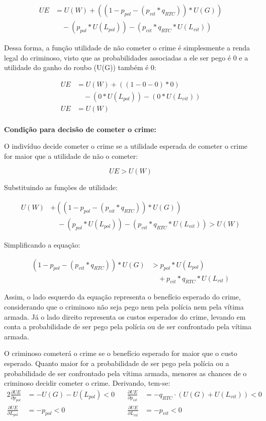 \documentclass[12pt]{article}
\begin{document}
\begin{align*}
UE &= U(W) + \left( \left( 1 - p_{pol} - (p_{vit} * q_{RTC}) \right) * U(G) \right) \\
   &\quad - \left( p_{pol} * U(L_{pol}) \right) - \left( p_{vit} * q_{RTC} * U(L_{vit}) \right)
\end{align*}

Dessa forma, a função utilidade de não cometer o crime é simplesmente a
renda legal do criminoso, visto que as probabilidades associadas a ele
ser pego é 0 e a utilidade do ganho do roubo (U(G)) também é 0:

\begin{align*}
UE &= U(W) + \left( (1 - 0 - 0) * 0 \right) \\
   &\quad - \left( 0 * U(L_{pol}) \right) - \left( 0 * U(L_{vit}) \right) \\
UE &= U(W)
\end{align*}\\

\textbf{Condição para decisão de cometer o crime:}

O indivíduo decide cometer o crime se a utilidade esperada de cometer o
crime for maior que a utilidade de não o cometer:

\[
UE > U(W)
\]

Substituindo as funções de utilidade:

\begin{align*}
U(W) &+ \left( \left( 1 - p_{pol} - (p_{vit} * q_{RTC}) \right) * U(G) \right) \\
     &\quad - \left( p_{pol} * U(L_{pol}) \right) - \left( p_{vit} * q_{RTC} * U(L_{vit}) \right) > U(W)
\end{align*}

Simplificando a equação:

\begin{align*}
\left( 1 - p_{pol} - (p_{vit} * q_{RTC}) \right) * U(G) &> p_{pol} * U(L_{pol}) \\
                                                         &\quad + p_{vit} * q_{RTC} * U(L_{vit})
\end{align*}

Assim, o lado esquerdo da equação representa o benefício esperado do
crime, considerando que o criminoso não seja pego nem pela polícia nem
pela vítima armada. Já o lado direito representa os custos esperados do
crime, levando em conta a probabilidade de ser pego pela polícia ou de
ser confrontado pela vítima armada.


O criminoso cometerá o crime se o benefício esperado for maior que o
custo esperado. Quanto maior for a probabilidade de ser pego pela
polícia ou a probabilidade de ser confrontado pela vítima armada,
menores as chances de o criminoso decidir cometer o crime. Derivando,
tem-se:
\begin{alignat*}{2}
\frac{\partial UE}{\partial p_{pol}} &= -U(G) - U\left( L_{pol} \right) < 0 \quad &\frac{\partial UE}{\partial p_{vit}} &= -q_{RTC} \cdot (U(G) + U\left( L_{vit} \right)) < 0 \\
\frac{\partial UE}{\partial L_{pol}} &= -p_{pol} < 0 \quad &\frac{\partial UE}{\partial L_{vit}} &= -p_{vit} < 0
\end{alignat*}
\end{document}
